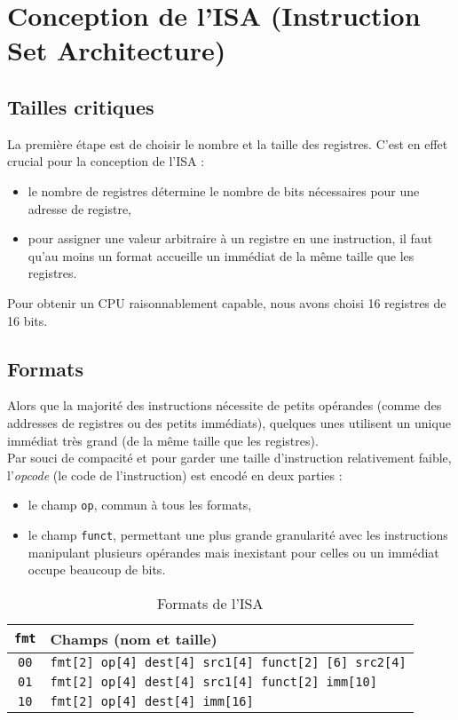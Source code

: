 \chapter{Conception de l'ISA (Instruction Set Architecture)}

\section{Tailles critiques}

La première étape est de choisir le nombre et la taille des registres. C'est en
effet crucial pour la conception de l'ISA :
\begin{itemize}
\item le nombre de registres détermine le nombre de bits nécessaires pour une
    adresse de registre,
\item pour assigner une valeur arbitraire à un registre en une instruction, il
    faut qu'au moins un format accueille un immédiat de la même taille que les
    registres. \\
\end{itemize}

Pour obtenir un CPU raisonnablement capable, nous avons choisi 16 registres de
16 bits.

\section{Formats}

Alors que la majorité des instructions nécessite de petits opérandes (comme des
addresses de registres ou des petits immédiats), quelques unes utilisent un
unique immédiat très grand (de la même taille que les registres). \\

Par souci de compacité et pour garder une taille d'instruction relativement
faible, l'\textit{opcode} (le code de l'instruction) est encodé en deux parties :
\begin{itemize}
\item le champ \texttt{op}, commun à tous les formats,
\item le champ \texttt{funct}, permettant une plus grande granularité avec les
    instructions manipulant plusieurs opérandes mais inexistant pour celles ou
    un immédiat occupe beaucoup de bits.
\end{itemize}

\begin{table}[ht]
    \centering
    \begin{tabular}{cl}
    \toprule
    \texttt{fmt} & Champs (nom et taille) \\
    \midrule
    \texttt{00} & \texttt{fmt[2] op[4] dest[4] src1[4] funct[2] [6] src2[4]} \\
    \texttt{01} & \texttt{fmt[2] op[4] dest[4] src1[4] funct[2] imm[10]} \\
    \texttt{10} & \texttt{fmt[2] op[4] dest[4] imm[16]} \\
    \bottomrule
    \end{tabular}
    \caption{Formats de l'ISA}
    \label{tab:formats}
\end{table}

